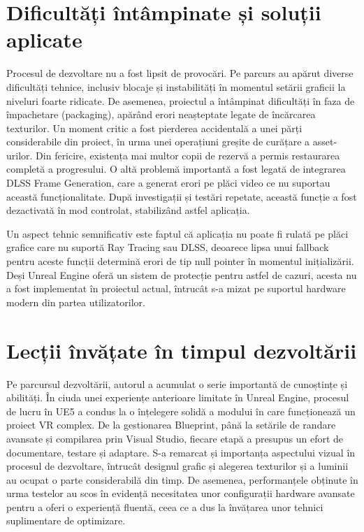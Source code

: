 \section{Dificultăți întâmpinate și soluții aplicate}
Procesul de dezvoltare nu a fost lipsit de provocări. Pe parcurs au apărut diverse dificultăți tehnice, inclusiv blocaje și instabilități în momentul setării graficii la niveluri foarte ridicate. De asemenea, proiectul a întâmpinat dificultăți în faza de împachetare (packaging), apărând erori neașteptate legate de încărcarea texturilor. Un moment critic a fost pierderea accidentală a unei părți considerabile din proiect, în urma unei operațiuni greșite de curățare a asset-urilor. Din fericire, existența mai multor copii de rezervă a permis restaurarea completă a progresului. O altă problemă importantă a fost legată de integrarea DLSS Frame Generation, care a generat erori pe plăci video ce nu suportau această funcționalitate. După investigații și testări repetate, această funcție a fost dezactivată în mod controlat, stabilizând astfel aplicația.

Un aspect tehnic semnificativ este faptul că aplicația nu poate fi rulată pe plăci grafice care nu suportă Ray Tracing sau DLSS, deoarece lipsa unui fallback pentru aceste funcții determină erori de tip null pointer în momentul inițializării. Deși Unreal Engine oferă un sistem de protecție pentru astfel de cazuri, acesta nu a fost implementat în proiectul actual, întrucât s-a mizat pe suportul hardware modern din partea utilizatorilor.

\section{Lecții învățate în timpul dezvoltării}
Pe parcursul dezvoltării, autorul a acumulat o serie importantă de cunoștințe și abilități. În ciuda unei experiențe anterioare limitate în Unreal Engine, procesul de lucru în UE5 a condus la o înțelegere solidă a modului în care funcționează un proiect VR complex. De la gestionarea Blueprint, până la setările de randare avansate și compilarea prin Visual Studio, fiecare etapă a presupus un efort de documentare, testare și adaptare. S-a remarcat și importanța aspectului vizual în procesul de dezvoltare, întrucât designul grafic și alegerea texturilor și a luminii au ocupat o parte considerabilă din timp. De asemenea, performanțele obținute în urma testelor au scos în evidență necesitatea unor configurații hardware avansate pentru a oferi o experiență fluentă, ceea ce a dus la învățarea unor tehnici suplimentare de optimizare.

